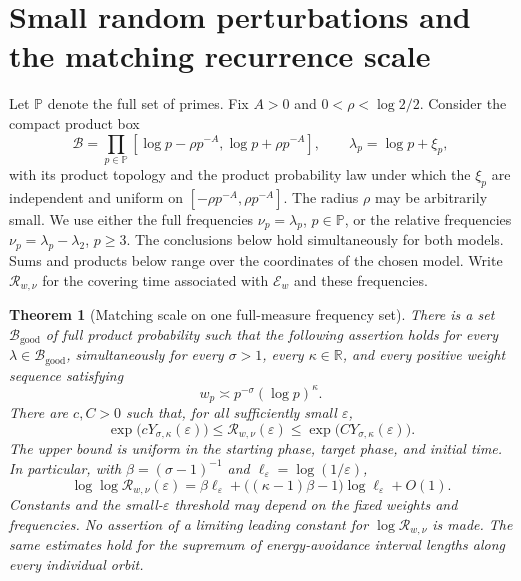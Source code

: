 \documentclass[11pt,letterpaper]{article}
\newtheorem{theorem}{Theorem}[section]
\theoremstyle{definition}
\theoremstyle{remark}
\newcommand{\eps}{\varepsilon}
\newcommand{\1}{\mathbf 1}
\begin{document}
\section{Small random perturbations and the matching recurrence scale}
\label{p02:sec:generic}

Let $\mathbb P$ denote the full set of primes. Fix $A>0$ and
$0<\rho<\log2/2$. Consider the compact product box
\[
 \mathcal B=\prod_{p\in\mathbb P}
 [\log p-\rho p^{-A},\log p+\rho p^{-A}],
 \qquad \lambda_p=\log p+\xi_p,
\]
with its product topology and the product probability law under which
the $\xi_p$ are independent and uniform on
$[-\rho p^{-A},\rho p^{-A}]$.
The radius $\rho$ may be arbitrarily small. We use either the full
frequencies $\nu_p=\lambda_p$, $p\in\mathbb P$, or the relative frequencies
$\nu_p=\lambda_p-\lambda_2$, $p\ge3$. The conclusions below hold
simultaneously for both models. Sums and products below range over
the coordinates of the chosen model. Write $\mathcal R_{w,\nu}$ for the
covering time associated with $\mathcal E_w$ and these frequencies.

\begin{theorem}[Matching scale on one full-measure frequency set]
\label{p02:thm:generic}
There is a set $\mathcal B_{\mathrm{good}}$ of full product probability
such that the following assertion holds for every
$\lambda\in\mathcal B_{\mathrm{good}}$, simultaneously for every
$\sigma>1$, every $\kappa\in\mathbb R$, and every positive weight
sequence satisfying
\[
 w_p\asymp p^{-\sigma}(\log p)^\kappa.
\]
There are $c,C>0$ such that, for all sufficiently small $\eps$,
\begin{equation}\label{p02:eq:generic-scale}
 \exp\bigl(cY_{\sigma,\kappa}(\eps)\bigr)
 \le\mathcal R_{w,\nu}(\eps)
 \le\exp\bigl(CY_{\sigma,\kappa}(\eps)\bigr).
\end{equation}
The upper bound is uniform in the starting phase, target phase, and
initial time. In particular, with $\beta=(\sigma-1)^{-1}$ and
$\ell_\eps=\log(1/\eps)$,
\begin{equation}\label{p02:eq:generic-second-order}
 \log\log\mathcal R_{w,\nu}(\eps)
 =\beta\ell_\eps+
   \bigl((\kappa-1)\beta-1\bigr)\log\ell_\eps+O(1).
\end{equation}
Constants and the small-$\eps$ threshold may depend on the fixed
weights and frequencies. No assertion of a limiting leading constant
for $\log\mathcal R_{w,\nu}$ is made.
The same estimates hold for the supremum of energy-avoidance interval
lengths along every individual orbit.
\end{theorem}
\end{document}
